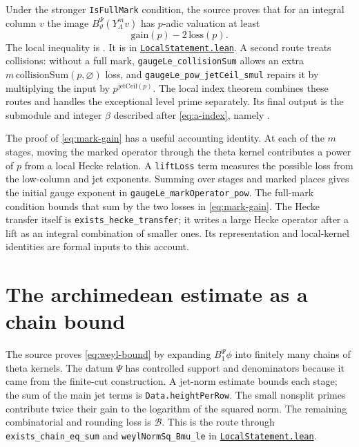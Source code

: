 \documentclass[11pt,oneside,openany]{amsbook}
\theoremstyle{remark}
\numberwithin{equation}{section}
\newcommand{\ghroot}{https://github.com/lsernau/grh-lean/blob/}
\newcommand{\ghrev}{72fead102f663d5c7a407964a13dc0cf9d977207}
\newcommand{\leanfile}[2]{%
  \href{\ghroot\ghrev/grh-compact/src/#1}{\nolinkurl{#2}}}
\begin{document}
Under the stronger \texttt{IsFullMark} condition, the
source proves that for an integral column $v$ the image
$B^\Psi_\vartheta(Y_\Lambda^m v)$ has $p$-adic
valuation at least
\begin{equation}
\label{eq:mark-gain}
\mathrm{gain}(p)-2\,\mathrm{loss}(p).
\end{equation}
The local inequality is
.
It is in \leanfile{New/Columns/LocalStatement.lean}%
{LocalStatement.lean}. A second route treats collisions:
without a full mark, \texttt{gaugeLe\_collisionSum}
allows an extra $m\,\mathrm{collisionSum}(p,\varnothing)$
loss, and \texttt{gaugeLe\_pow\_jetCeil\_smul}
repairs it by multiplying the input by
$p^{\mathrm{jetCeil}(p)}$. The local index theorem combines
these routes and handles the exceptional level prime
separately. Its final output is the submodule and integer
$\beta$ described after \eqref{eq:a-index}, namely
.

The proof of \eqref{eq:mark-gain} has a useful accounting
identity. At each of the $m$ stages, moving the marked
operator through the theta kernel contributes a power
of $p$ from a local Hecke relation. A \texttt{liftLoss}
term measures the possible loss from the low-column
and jet exponents. Summing over stages and marked places
gives the initial gauge exponent in
\texttt{gaugeLe\_markOperator\_pow}. The full-mark
condition bounds that sum by the two losses in
\eqref{eq:mark-gain}. The Hecke transfer itself is
\texttt{exists\_hecke\_transfer}; it writes a large Hecke
operator after a lift as an integral combination of
smaller ones. Its representation and local-kernel
identities are formal inputs to this account.

\section{The archimedean estimate as a chain bound}
\label{sec:arch-chain}
The source proves \eqref{eq:weyl-bound} by expanding
$B^\Psi_1\phi$ into finitely many chains of theta
kernels. The datum $\Psi$ has controlled support and
denominators because it came from the finite-cut
construction. A jet-norm estimate bounds each stage;
the sum of the main jet terms is
\texttt{Data.heightPerRow}. The small nonsplit primes
contribute twice their gain to the logarithm of the
squared norm. The remaining combinatorial and rounding
loss is $\mathcal B$. This is the route through
\texttt{exists\_chain\_eq\_sum} and
\texttt{weylNormSq\_Bmu\_le} in
\leanfile{New/Columns/LocalStatement.lean}%
{LocalStatement.lean}.
\end{document}
